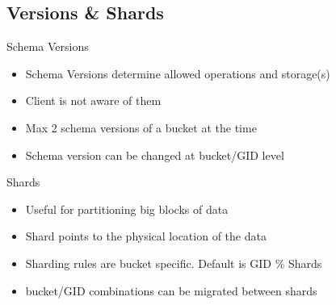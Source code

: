 \documentclass[aspectratio=43]{beamer}
\begin{document}
\subsection{Versions \& Shards}

\begin{frame}{Schema Versions}
    \begin{itemize}
        \item Schema Versions determine allowed operations and storage(s)
        \item Client is not aware of them
        \item Max 2 schema versions of a bucket at the time
        \item Schema version can be changed at bucket/GID level
    \end{itemize}
\end{frame}

\begin{frame}{Shards}
    \begin{itemize}
        \item Useful for partitioning big blocks of data
        \item Shard points to the physical location of the data
        \item Sharding rules are bucket specific. Default is GID \% Shards
        \item bucket/GID combinations can be migrated between shards
    \end{itemize}
\end{frame}
\end{document}
